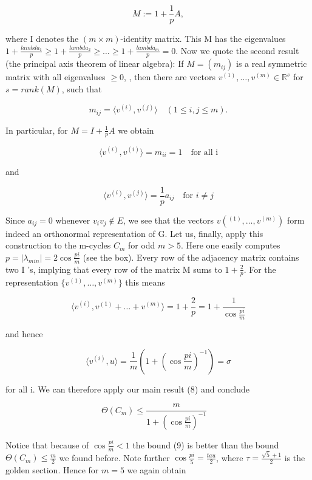 \documentclass[openany,12pt]{memoir}
\newcommand{\setnewpagemargins}{
    \clearpage
    \setulmarginsandblock{2cm}{0.5cm}{*}
    \checkandfixthelayout
}
\begin{document}
\[
M := 1 + {\frac{1}{p}}A,
\]

where I denotes the $(m \times m)$-identity matrix. This M has the eigenvalues
$1+{\frac{lambda_1}{p}} \geq 1+{\frac{lambda_2}{p}} \geq \ldots \geq 1+{\frac{lambda_m}{p}} =0$. Now we quote the second result (the
principal axis theorem of linear algebra): If $M = (m_{ij})$ is a real symmetric 
matrix with all eigenvalues $\geq 0$, , then there are vectors $v^{(1)}, \ldots, v^{(m)} \in \mathbb{R}^s$
for $s = rank(M)$, such that 

\[
m_{ij} = \langle v^{(i)}, v^{(j)} \rangle  \quad  (1 \leq i,j \leq m).
\]

In particular, for $M = I + {\frac{1}{p}}A$ we obtain

\[
\langle v^{(i)}, v^{(i)} \rangle = m_{ii} = 1  \quad \text{for all i}
\]

and

\[
\langle v^{(i)}, v^{(j)} \rangle = {\frac{1}{p}}a_{ij} \quad \text{for $i \neq j$}
\]

Since $a_{ij} = 0 $ whenever $ v_i v_j \notin E$, we see that the vectors $v(^{(1)},\ldots,v^{(m)})$
form indeed an orthonormal representation of G. 
Let us, finally, apply this construction to the m-cycles $C_m$ for odd $m > 5$. 
Here one easily computes $p = |\lambda_{min}| = 2\cos{\frac{pi}{m}}$ (see the box). Every 
row of the adjacency matrix contains two I 's, implying that every row of 
the matrix M sums to $1 + {\frac{2}{p}}$. For the representation $\{ v^{(1)}, \ldots, v^{(m)}\}$ this
means

\[ 
    \langle v^{(i)},v^{(1)}+ \ldots + v^{(m)} \rangle=1+{\frac{2}{p}}=1+{\frac{1}{\cos{\frac{pi}{m}}}}
\]

and hence 

\[
\langle v^{(i)},u \rangle = {\frac{1}{m}}(1+(\cos{\frac{pi}{m}})^{-1})=\sigma
\]

for all i. We can therefore apply our main result (8) and conclude

\begin{equation}
    \Theta(C_m) \leq {\frac{m}{1+(\cos{\frac{pi}{m}})^{-1}}} \quad \label{nine}    
\end{equation}


\setnewpagemargins

Notice that because of $\cos{\frac{pi}{m}} < 1$ the bound (9) is better than the bound 
$\Theta(C_m) \leq {\frac{m}{2}}$ we found before. Note further $\cos{\frac{pi}{5}} = {\frac{tau}{2}}$, where $\tau = {\frac{\sqrt{5}+1}{2}}$
is the golden section. Hence for $m = 5$ we again obtain
\end{document}
